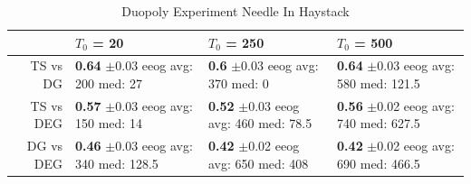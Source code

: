 \documentclass[11pt,letterpaper]{article}
\begin{document}
\begin{table}[H]
\centering
\caption{Duopoly Experiment Needle In Haystack} 
\begin{tabular}{rlll}
  \hline
 & $T_0$ = 20 & $T_0$ = 250 & $T_0$ = 500 \\ 
  \hline
TS vs DG & \makecell{\textbf{0.64} $\pm$0.03\\ eeog \\ avg: 200\\ med: 27} & \makecell{\textbf{0.6} $\pm$0.03\\ eeog \\ avg: 370\\ med: 0} & \makecell{\textbf{0.64} $\pm$0.03\\ eeog \\ avg: 580\\ med: 121.5} \\ 
  TS vs DEG & \makecell{\textbf{0.57} $\pm$0.03\\ eeog \\ avg: 150\\ med: 14} & \makecell{\textbf{0.52} $\pm$0.03\\ eeog \\ avg: 460\\ med: 78.5} & \makecell{\textbf{0.56} $\pm$0.02\\ eeog \\ avg: 740\\ med: 627.5} \\ 
  DG vs DEG & \makecell{\textbf{0.46} $\pm$0.03\\ eeog \\ avg: 340\\ med: 128.5} & \makecell{\textbf{0.42} $\pm$0.02\\ eeog \\ avg: 650\\ med: 408} & \makecell{\textbf{0.42} $\pm$0.02\\ eeog \\ avg: 690\\ med: 466.5} \\ 
   \hline
\end{tabular}
\end{table}
\end{document}

